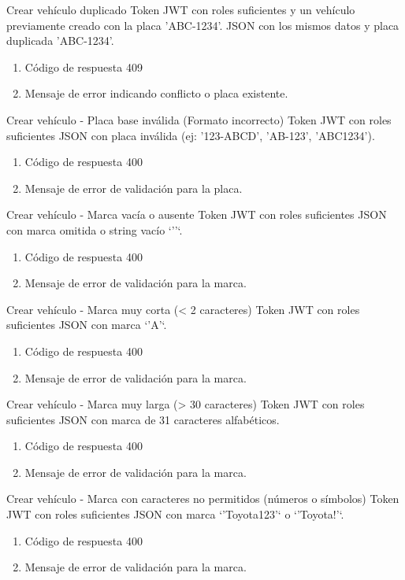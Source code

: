 {Crear vehículo duplicado}
{Token JWT con roles suficientes y un vehículo previamente creado con la placa 'ABC-1234'.}
{JSON con los mismos datos y placa duplicada 'ABC-1234'.}
{\begin{enumerate} [leftmargin=*, nosep]
    \item Código de respuesta 409
    \item Mensaje de error indicando conflicto o placa existente.
\end{enumerate}}

{Crear vehículo - Placa base inválida (Formato incorrecto)}
{Token JWT con roles suficientes}
{JSON con placa inválida (ej: '123-ABCD', 'AB-123', 'ABC1234').}
{\begin{enumerate} [leftmargin=*, nosep]
    \item Código de respuesta 400
    \item Mensaje de error de validación para la placa.
\end{enumerate}}

{Crear vehículo - Marca vacía o ausente}
{Token JWT con roles suficientes}
{JSON con marca omitida o string vacío `''`.}
{\begin{enumerate} [leftmargin=*, nosep]
    \item Código de respuesta 400
    \item Mensaje de error de validación para la marca.
\end{enumerate}}

{Crear vehículo - Marca muy corta (< 2 caracteres)}
{Token JWT con roles suficientes}
{JSON con marca `'A'`.}
{\begin{enumerate} [leftmargin=*, nosep]
    \item Código de respuesta 400
    \item Mensaje de error de validación para la marca.
\end{enumerate}}

{Crear vehículo - Marca muy larga (> 30 caracteres)}
{Token JWT con roles suficientes}
{JSON con marca de 31 caracteres alfabéticos.}
{\begin{enumerate} [leftmargin=*, nosep]
    \item Código de respuesta 400
    \item Mensaje de error de validación para la marca.
\end{enumerate}}

{Crear vehículo - Marca con caracteres no permitidos (números o símbolos)}
{Token JWT con roles suficientes}
{JSON con marca `'Toyota123'` o `'Toyota!'`.}
{\begin{enumerate} [leftmargin=*, nosep]
    \item Código de respuesta 400
    \item Mensaje de error de validación para la marca.
\end{enumerate}}

